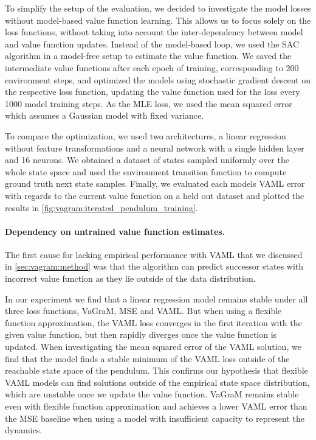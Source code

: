 To simplify the setup of the evaluation, we decided to investigate the model losses without model-based value function learning.
This allows us to focus solely on the loss functions, without taking into account the inter-dependency between model and value function updates.
Instead of the model-based loop, we used the SAC algorithm in a model-free setup to estimate the value function.
We saved the intermediate value functions after each epoch of training, corresponding to 200 environment steps, and optimized the models using stochastic gradient descent on the respective loss function, updating the value function used for the loss every 1000 model training steps.
As the MLE loss, we used the mean squared error which assumes a Gaussian model with fixed variance.

To compare the optimization, we used two architectures, a linear regression without feature transformations and a neural network with a single hidden layer and 16 neurons.
We obtained a dataset of states sampled uniformly over the whole state space and used the environment transition function to compute ground truth next state samples.
Finally, we evaluated each models VAML error with regards to the current value function on a held out dataset and plotted the results in \autoref{fig:vagram:iterated_pendulum_training}.

\paragraph{Dependency on untrained value function estimates.}
The first cause for lacking empirical performance with VAML that we discussed in \autoref{sec:vagram:method} was that the algorithm can predict successor states with incorrect value function as they lie outside of the data distribution.

In our experiment we find that a linear regression model remains stable under all three loss functions, VaGraM, MSE and VAML.
But when using a flexible function approximation, the VAML loss converges in the first iteration with the given value function, but then rapidly diverges once the value function is updated.
When investigating the mean squared error of the VAML solution, we find that the model finds a stable minimum of the VAML loss outside of the reachable state space of the pendulum.
This confirms our hypothesis that flexible VAML models can find solutions outside of the empirical state space distribution, which are unstable once we update the value function.
VaGraM remains stable even with flexible function approximation and achieves a lower VAML error than the MSE baseline when using a model with insufficient capacity to represent the dynamics.

